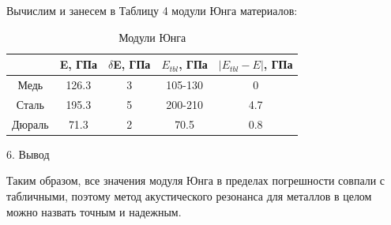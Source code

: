 \documentclass[12pt, a4paper]{article}
\begin{document}
Вычислим и занесем в Таблицу 4 модули Юнга материалов:

\begin{table}[h!]
\begin{center}
\begin{tabular}{|c|c|c|c|c|}
    \hline
    & E, ГПа& $\delta$E, ГПа& $E_{tbl}$, ГПа& $|E_{tbl}-E|$, ГПа\\
    \hline
     Медь& 126.3 & 3& 105-130& 0\\
    \hline
     Сталь& 195.3& 5&  200-210& 4.7\\
    \hline
     Дюраль& 71.3& 2& 70.5& 0.8\\
    \hline
    \end{tabular}
    \caption{Модули Юнга}
\end{center}
    \end{table}

    \vspace*{0.3cm}
    {\Large 6. Вывод \\} 

    Таким образом, все значения модуля Юнга в пределах погрешности совпали
    с табличными, поэтому метод акустического резонанса для металлов 
    в целом можно назвать точным и надежным.
\end{document}
